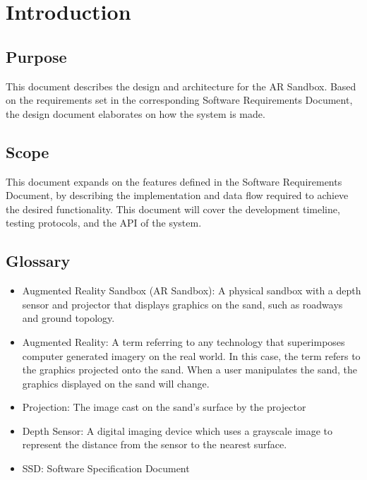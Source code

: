 \documentclass[onecolumn, draftclsnofoot,10pt, compsoc]{IEEEtran}
\begin{document}
\section{Introduction}

\subsection{Purpose}
This document describes the design and architecture for the AR Sandbox. Based on the requirements set in the corresponding Software Requirements Document, the design document elaborates on how the system is made.

\subsection{Scope}
This document expands on the features defined in the Software Requirements Document, by describing the implementation and data flow required to achieve the desired functionality. This document will cover the development timeline, testing protocols, and the API of the system.


\subsection{Glossary}
\begin{itemize}
\item Augmented Reality Sandbox (AR Sandbox): A physical sandbox with a depth sensor and projector that displays graphics on the sand, such as roadways and ground topology.
\item Augmented Reality: A term referring to any technology that superimposes computer generated imagery on the real world. In this case, the term refers to the graphics projected onto the sand. When a user manipulates the sand, the graphics displayed on the sand will change.
\item Projection: The image cast on the sand's surface by the projector
\item Depth Sensor: A digital imaging device which uses a grayscale image to represent the distance from the sensor to the nearest surface.
\item SSD: Software Specification Document
\end{itemize}
\end{document}
